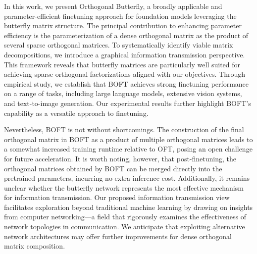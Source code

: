 In this work, we present Orthogonal Butterfly, a broadly applicable and parameter-efficient finetuning approach for foundation models leveraging the butterfly matrix structure. The principal contribution to enhancing parameter efficiency is the parameterization of a dense orthogonal matrix as the product of several sparse orthogonal matrices. To systematically identify viable matrix decompositions, we introduce a graphical information transmission perspective. This framework reveals that butterfly matrices are particularly well suited for achieving sparse orthogonal factorizations aligned with our objectives. Through empirical study, we establish that BOFT achieves strong finetuning performance on a range of tasks, including large language models, extensive vision systems, and text-to-image generation. Our experimental results further highlight BOFT's capability as a versatile approach to finetuning.

Nevertheless, BOFT is not without shortcomings. The construction of the final orthogonal matrix in BOFT as a product of multiple orthogonal matrices leads to a somewhat increased training runtime relative to OFT, posing an open challenge for future acceleration. It is worth noting, however, that post-finetuning, the orthogonal matrices obtained by BOFT can be merged directly into the pretrained parameters, incurring no extra inference cost. Additionally, it remains unclear whether the butterfly network represents the most effective mechanism for information transmission. Our proposed information transmission view facilitates exploration beyond traditional machine learning by drawing on insights from computer networking—a field that rigorously examines the effectiveness of network topologies in communication. We anticipate that exploiting alternative network architectures may offer further improvements for dense orthogonal matrix composition.

